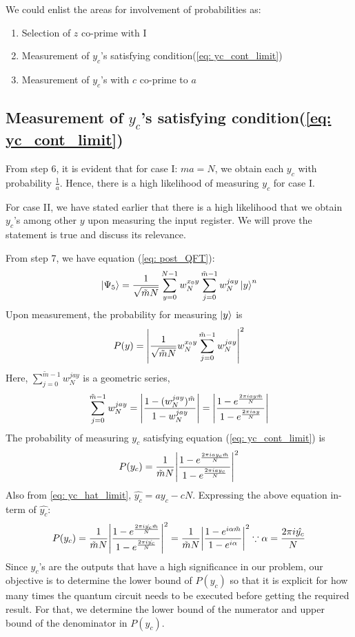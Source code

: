 We could enlist the areas for involvement of probabilities as:
\begin{enumerate}
    \item Selection of $z$ co-prime with I
    \item Measurement of $y_c$'s satisfying condition(\ref{eq: yc_cont_limit})
    \item Measurement of $y_c$'s with $c$ co-prime to $a$
\end{enumerate}
\subsection{Measurement of $y_c$'s satisfying condition(\ref{eq: yc_cont_limit})} \label{sub: prob_2}
From step 6, it is evident that for case I: $ma=N$, we obtain each $y_c$ with probability $\frac{1}{a}$. Hence, there is a high likelihood of measuring $y_c$ for case I. 

For case II, we have stated earlier that there is a high likelihood that we obtain $y_c$'s among other $y$ upon measuring the input register. We will prove the statement is true and discuss its relevance.

From step 7, we have equation (\ref{eq: post_QFT}):
\begin{equation}
    \ket{\Psi_5}   = \frac{1}{\sqrt{\Tilde{m} N}} \sum_{y=0} ^{N-1} w_N ^{x_0 y} \sum_{j=0} ^ {\Tilde{m} - 1} w_N ^{j a y} \ket{y}^n 
\end{equation}
Upon measurement, the probability for measuring $\ket{y}$ is 
\begin{equation*}
       P(y) = \abs{\frac{1}{\sqrt{\tilde{m}N}} w_N^{x_0 y} \sum_{j=0}^{\tilde{m}-1} w_N ^{j a y} }^2
\end{equation*}
Here, $\sum_{j=0}^{\tilde{m}-1} w_N ^{j a y}$ is a geometric series,
\begin{equation*}
    \sum_{j=0}^{\tilde{m}-1} w_N ^{j a y} = \abs{\frac{1-(w_N ^{j a y})^{\tilde{m}}}{1-w_N ^{j a y}}} =  \abs{\frac{1-e ^{\frac{2 \pi i a y \tilde{m}}{N}}}{1-e ^{\frac{2 \pi i a y}{N}}  }}
\end{equation*}
The probability of measuring $y_c$ satisfying equation (\ref{eq: yc_cont_limit}) is 
\begin{equation*}
    P(y_c)= \frac{1}{\tilde{m}N}\abs{\frac{1-e ^{\frac{2 \pi i a y_c \tilde{m}}{N}}}{1-e ^{\frac{2 \pi i a y_c}{N}}}}^2
\end{equation*}
Also from \ref{eq: yc_hat_limit}, $\hat{y_c} =a y_c-cN$. Expressing the above equation in-term of $\hat{y_c}$:
\begin{equation}
    P(y_c)= \frac{1}{\tilde{m}N}\abs{\frac{1-e ^{\frac{2 \pi i \hat{y_c} \tilde{m}}{N}}}{1-e ^{\frac{2 \pi i  \hat{y_c}}{N}}}}^2 = \frac{1}{\tilde{m}N}\abs{\frac{1-e ^{i\alpha \tilde{m}}}{1-e ^{i\alpha }}}^2\because \alpha = \frac{2 \pi i \hat{y_c}}{N}
    \label{eq: probability_y_c}
\end{equation}
Since $y_c$'s are the outputs that have a high significance in our problem,  our objective is to determine the lower bound of $P(y_c)$ so that it is explicit for how many times the quantum circuit needs to be executed before getting the required result. For that, we determine the lower bound of the numerator and upper bound of the denominator in $P(y_c)$.

